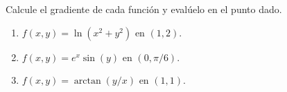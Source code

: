 Calcule el gradiente de cada función y evalúelo en el punto dado.
\begin{enumerate}
    \item $f(x, y) = \ln(x^2 + y^2)$ en $(1, 2)$.
    \item $f(x, y) = e^{x}\sin(y)$ en $(0, \pi/6)$.
    \item $f(x, y) = \arctan(y/x)$ en $(1, 1)$.
\end{enumerate}
